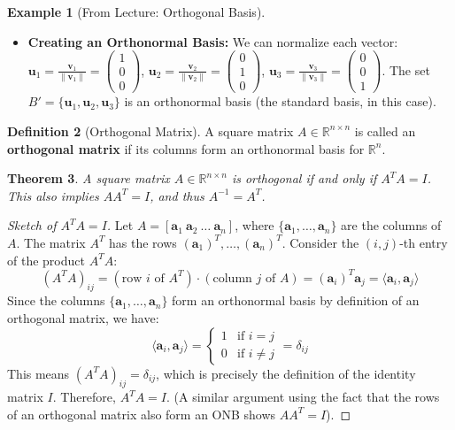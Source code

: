 \documentclass[11pt]{article}
\newtheorem{theorem}{Theorem}[section]
\theoremstyle{definition}
\newtheorem{definition}[theorem]{Definition}
\newtheorem{example}[theorem]{Example}
\theoremstyle{remark}
\newcommand{\R}{\mathbb{R}}
\newcommand{\inner}[2]{\langle #1, #2 \rangle}
\newcommand{\norm}[1]{\| #1 \|}
\newcommand{\trans}{^T} %
\begin{document}
\begin{example}[From Lecture: Orthogonal Basis]
\begin{itemize}
    \item \textbf{Creating an Orthonormal Basis:} We can normalize each vector:
        $\mathbf{u}_1 = \frac{\mathbf{v}_1}{\norm{\mathbf{v}_1}} = \begin{pmatrix} 1 \\ 0 \\ 0 \end{pmatrix}$,
        $\mathbf{u}_2 = \frac{\mathbf{v}_2}{\norm{\mathbf{v}_2}} = \begin{pmatrix} 0 \\ 1 \\ 0 \end{pmatrix}$,
        $\mathbf{u}_3 = \frac{\mathbf{v}_3}{\norm{\mathbf{v}_3}} = \begin{pmatrix} 0 \\ 0 \\ 1 \end{pmatrix}$.
        The set $B' = \{\mathbf{u}_1, \mathbf{u}_2, \mathbf{u}_3\}$ is an orthonormal basis (the standard basis, in this case).
\end{itemize}
\end{example}

\begin{definition}[Orthogonal Matrix]
A square matrix $A \in \R^{n \times n}$ is called an \textbf{orthogonal matrix} if its columns form an orthonormal basis for $\R^n$.
\end{definition}

\begin{theorem}
A square matrix $A \in \R^{n \times n}$ is orthogonal if and only if $A\trans A = I$. This also implies $A A\trans = I$, and thus $A^{-1} = A\trans$.
\end{theorem}
\begin{proof}[Sketch of $A\trans A = I$]
Let $A = [\mathbf{a}_1 \ \mathbf{a}_2 \ \dots \ \mathbf{a}_n]$, where $\{\mathbf{a}_1, \dots, \mathbf{a}_n\}$ are the columns of $A$.
The matrix $A\trans$ has the rows $(\mathbf{a}_1)\trans, \dots, (\mathbf{a}_n)\trans$.
Consider the $(i, j)$-th entry of the product $A\trans A$:
\[ (A\trans A)_{ij} = (\text{row } i \text{ of } A\trans) \cdot (\text{column } j \text{ of } A) = (\mathbf{a}_i)\trans \mathbf{a}_j = \inner{\mathbf{a}_i}{\mathbf{a}_j} \]
Since the columns $\{\mathbf{a}_1, \dots, \mathbf{a}_n\}$ form an orthonormal basis by definition of an orthogonal matrix, we have:
\[ \inner{\mathbf{a}_i}{\mathbf{a}_j} = \begin{cases} 1 & \text{if } i = j \\ 0 & \text{if } i \neq j \end{cases} = \delta_{ij} \]
This means $(A\trans A)_{ij} = \delta_{ij}$, which is precisely the definition of the identity matrix $I$. Therefore, $A\trans A = I$.
(A similar argument using the fact that the rows of an orthogonal matrix also form an ONB shows $AA\trans = I$).
\end{proof}
\end{document}
